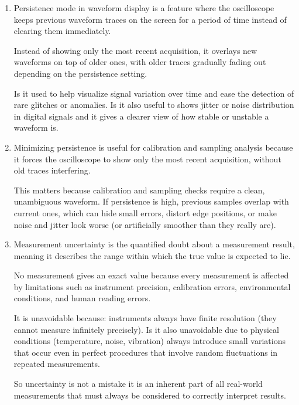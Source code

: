\documentclass[../main.tex]{subfiles}
\begin{document}
\begin{enumerate}[label=\textbf{\arabic*.}]
	However, it can make waveforms look less smooth, which is why many oscilloscopes also use line or interpolation modes for normal viewing.

	
	
	\item Persistence mode in waveform display is a feature where the oscilloscope keeps previous waveform traces on the screen for a period of time instead of clearing them immediately.

	Instead of showing only the most recent acquisition, it overlays new waveforms on top of older ones, with older traces gradually fading out depending on the persistence setting.

	Is it used to help visualize signal variation over time and ease the detection of rare glitches or anomalies.
	Is it also useful to shows jitter or noise distribution in digital signals and it gives a clearer view of how stable or unstable a waveform is.

	
	\item Minimizing persistence is useful for calibration and sampling analysis because it forces the oscilloscope to show only the most recent acquisition, without old traces interfering.

	This matters because calibration and sampling checks require a clean, unambiguous waveform. If persistence is high, previous samples overlap with current ones, which can hide small errors, distort edge positions, or make noise and jitter look worse (or artificially smoother than they really are).

	
	\item Measurement uncertainty is the quantified doubt about a measurement result, meaning it describes the range within which the true value is expected to lie.

	No measurement gives an exact value because every measurement is affected by limitations such as instrument precision, calibration errors, environmental conditions, and human reading errors.

	It is unavoidable because: instruments always have finite resolution (they cannot measure infinitely precisely). Is it also unavoidable due to physical conditions (temperature, noise, vibration) always introduce small variations that occur even in perfect procedures that involve random fluctuations in repeated measurements.

	So uncertainty is not a mistake it is an inherent part of all real-world measurements that must always be considered to correctly interpret results.
	

\end{enumerate}
\end{document}

